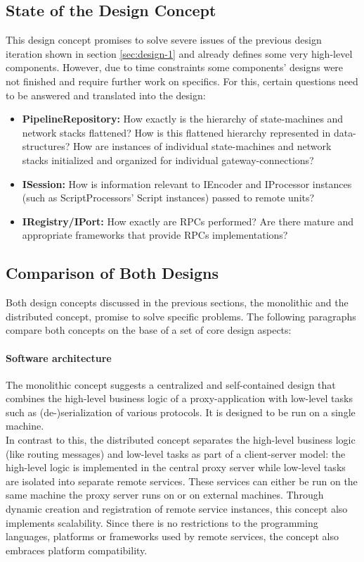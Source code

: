 \subsection{State of the Design Concept} This design concept promises to solve severe issues of the previous design iteration shown in section \ref{sec:design-1} and already defines some very high-level components. However, due to time constraints some components' designs were not  finished and require further work on specifics. For this, certain questions need to be answered and translated into the design:
\begin{itemize}
    \item \textbf{PipelineRepository:} How exactly is the hierarchy of state-machines and network stacks flattened? How is this flattened hierarchy represented in data-structures? How are instances of individual state-machines and network stacks initialized and organized for individual gateway-connections?
    \item \textbf{ISession:} How is information relevant to IEncoder and IProcessor instances (such as ScriptProcessors' Script instances) passed to remote units?
    \item \textbf{IRegistry/IPort:} How exactly are \acp{RPC} performed? Are there mature and appropriate frameworks that provide \acp{RPC} implementations?
\end{itemize}


\subsection{Comparison of Both Designs}
\label{sec:design-comparison}
Both design concepts discussed in the previous sections, the monolithic and the distributed concept, promise to solve specific problems. The following paragraphs compare both concepts on the base of a set of core design aspects:
\paragraph{Software architecture}
The monolithic concept suggests a centralized and self-contained design that combines the high-level business logic of a proxy-application with low-level tasks such as (de-)serialization of various protocols. It is designed to be run on a single machine.\\
In contrast to this, the distributed concept separates the high-level business logic (like routing messages) and low-level tasks as part of a client-server model: the high-level logic is implemented in the central proxy server while low-level tasks are isolated into separate remote services. These services can either be run on the same machine the proxy server runs on or on external machines. Through dynamic creation and registration of remote service instances, this concept also implements scalability. Since there is no restrictions to the programming languages, platforms or frameworks used by remote services, the concept also embraces platform compatibility.

